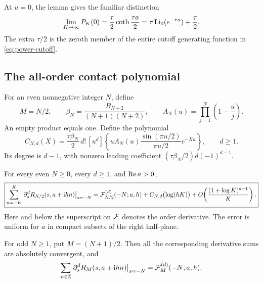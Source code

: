 At \(u=0\), the lemma gives the familiar distinction
\[
 \lim_{K\to\infty}P_K(0)
 =\frac{\tau}{2}\coth\frac{\tau a}{2}
 =\tau\operatorname{Li}_0(e^{-\tau a})+\frac{\tau}{2}.
\]
The extra \(\tau/2\) is the zeroth member of the entire cutoff
generating function in \eqref{eq:power-cutoff}.

\subsection{The all-order contact polynomial}

For an even nonnegative integer \(N\), define
\begin{equation}\label{eq:root-beta}
 M=N/2,\qquad
 \beta_N=\frac{B_{N+2}}{(N+1)(N+2)},\qquad
 A_N(u)=\prod_{j=1}^{N}\left(1-\frac uj\right).
\end{equation}
An empty product equals one. Define the polynomial
\begin{equation}\label{eq:contact-polynomial}
 \boxed{\displaystyle
 C_{N,d}(X)=
  \frac{\tau\beta_N}{2}\,d!\,[u^d]\!
  \left\{uA_N(u)\frac{\sin(\pi u/2)}{\pi u/2}e^{-Xu}\right\},
  \qquad d\geq1.}
\end{equation}
Its degree is \(d-1\), with nonzero leading coefficient
\((\tau\beta_N/2)d(-1)^{d-1}\).

\begin{theorem}\label{thm:minimal-contact}
For every even \(N\geq0\), every \(d\geq1\), and \(\operatorname{Re} a>0\),
\begin{equation}\label{eq:minimal-contact}
 \boxed{\displaystyle
 \sum_{n=-K}^{K}
   \left.\partial_s^dR_{N/2}(s,a+\mathrm i hn)\right|_{s=-N}
 =
 {\cal F}_{N/2}^{(d)}(-N;a,h)
 +C_{N,d}\bigl(\log(hK)\bigr)
 +O\!\left(\frac{(1+\log K)^{d-1}}K\right).}
\end{equation}
Here and below the superscript on \({\cal F}\) denotes the order
derivative. The error is uniform for \(a\) in compact subsets of
the right half-plane.

For odd \(N\geq1\), put \(M=(N+1)/2\). Then all the corresponding
derivative sums are absolutely convergent, and
\begin{equation}\label{eq:odd-all-jets}
 \sum_{n\in\mathbb Z}
 \left.\partial_s^dR_M(s,a+\mathrm i hn)\right|_{s=-N}
 ={\cal F}_M^{(d)}(-N;a,h).
\end{equation}
\end{theorem}

